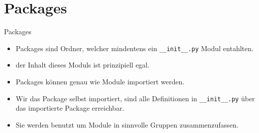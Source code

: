 \section{Packages}
\begin{frame}{Packages}
	\begin{itemize}
		\item Packages sind Ordner, welcher mindentens ein \texttt{\_\_init\_\_.py} Modul entahlten.
		\item der Inhalt dieses Moduls ist prinzipiell egal. 
		\item Packages können genau wie Module importiert werden.
		\item Wir das Package selbst importiert, sind alle Definitionen in \texttt{\_\_init\_\_.py} über das importierte Package erreichbar.
		\item Sie werden benutzt um Module in sinnvolle Gruppen zusammenzufassen.
	\end{itemize}
\end{frame}


